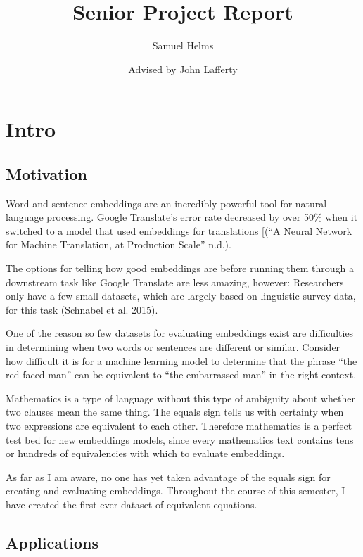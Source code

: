 \documentclass[]{article}
\title{Senior Project Report}
\author{Samuel Helms}
\date{Advised by John Lafferty}
\begin{document}
\maketitle

{
\setcounter{tocdepth}{3}
\tableofcontents
}
\hypertarget{intro}{%
\section{Intro}\label{intro}}

\hypertarget{motivation}{%
\subsection{Motivation}\label{motivation}}

Word and sentence embeddings are an incredibly powerful tool for natural
language processing. Google Translate's error rate decreased by over
50\% when it switched to a model that used embeddings for translations
{[}(``A Neural Network for Machine Translation, at Production Scale''
n.d.).

The options for telling how good embeddings are before running them
through a downstream task like Google Translate are less amazing,
however: Researchers only have a few small datasets, which are largely
based on linguistic survey data, for this task (Schnabel et al. 2015).

One of the reason so few datasets for evaluating embeddings exist are
difficulties in determining when two words or sentences are different or
similar. Consider how difficult it is for a machine learning model to
determine that the phrase ``the red-faced man'' can be equivalent to
``the embarrassed man'' in the right context.

Mathematics is a type of language without this type of ambiguity about
whether two clauses mean the same thing. The equals sign tells us with
certainty when two expressions are equivalent to each other. Therefore
mathematics is a perfect test bed for new embeddings models, since every
mathematics text contains tens or hundreds of equivalencies with which
to evaluate embeddings.

As far as I am aware, no one has yet taken advantage of the equals sign
for creating and evaluating embeddings. Throughout the course of this
semester, I have created the first ever dataset of equivalent equations.

\hypertarget{applications}{%
\subsection{Applications}\label{applications}}
\end{document}
